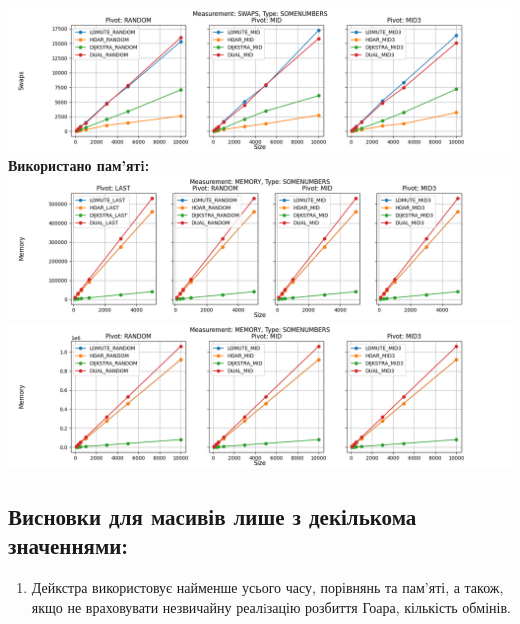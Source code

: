 \documentclass{article}
\begin{document}
        \includegraphics[scale=0.5]{somenumbers_Swaps_3_pivots_7_numbers.png}
        \newline
    \newpage
    \textbf{Використано пам’ятi:}
    \newline
        \includegraphics[scale=0.5]{somenumbers_Memory_6_numbers.png}
        \includegraphics[scale=0.5]{somenumbers_Memory_3_pivots_7_numbers.png}
    \subsection{Висновки для масивів лише з декількома значеннями:}
    \begin{enumerate}
        \item Дейкстра використовує найменше усього часу, порівнянь та пам'яті, а також, якщо не враховувати незвичайну реалiзацію розбиття Гоара, кількість обмінів.
    \end{enumerate}
    \newpage

\end{document}
